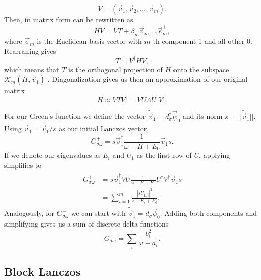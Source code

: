 \begin{equation}
    V = (\vec{v}_1, \vec{v}_2, \ldots, \vec{v}_m).
\end{equation}
Then,  in matrix form can be rewritten as
\begin{equation}
    H V = V T + \beta_{m}\vec{v}_{m+1}\vec{e}_{m}^\intercal,
\end{equation}
where $\vec{e}_m$ is the Euclidean basis vector with $m$-th component 1 and all other 0.
Rearraning gives
\begin{equation}
    T = V^\dag H V,
\end{equation}
which means that $T$ is the orthogonal projection of $H$ onto
the subspace $\mathcal{K}_m(H, \vec{v}_1)$ \cite{Cullum1985}.
Diagonalization gives us then an approximation of our original matrix
\begin{equation}
    H \approx V T V^\dag = V U \Lambda U^\dag V^\dag.
    \label{eq:Lanczos-matrix-approximation}
\end{equation}

For our Green's function we define the vector $\tilde{\vec{v}}_1 = d_\sigma^\dag \vec{\psi}_0$
and its norm $s = ||\tilde{\vec{v}}_1||$.
Using $\vec{v}_1 = \tilde{\vec{v}}_1/s$ as our initial Lanczos vector,
\begin{equation}
    G^+_{\sigma\omega} = s \vec{v}_1^\dag \frac{1}{\omega - H + E_0} \vec{v}_1 s.
\end{equation}
If we denote our eigenvalues as $E_i$ and $U_1$ as the first row of $U$,
applying  simplifies to
\begin{align}
    \begin{split}
        G^+_{\sigma\omega}
         & =
        s \vec{v}_1^\dag V U \frac{1}{\omega - E + E_0} U^\dag V^\dag \vec{v}_1 s \\
         & =
        \sum_{i=1}^m \frac{|s U_{1,i}|^2}{z - E_i + E_0}.
    \end{split}
\end{align}
Analogously, for $G^-_{\sigma\omega}$ we can start with $\tilde{\vec{v}}_1 = d_\sigma \vec{\psi}_0$.
Adding both components and simplifying gives us a sum of discrete delta-functions \cite{Lu2014}
\begin{equation}
    G_{\sigma\omega} = \sum_i \frac{b_i^2}{\omega - a_i}.
\end{equation}

\subsection{Block Lanczos}

